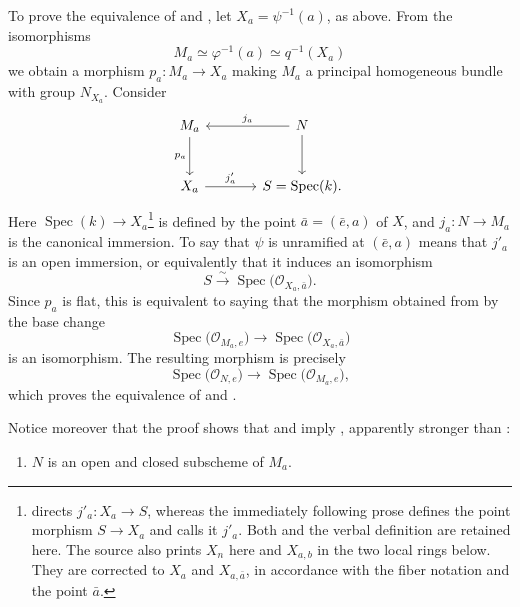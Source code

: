 To prove the equivalence of  and , let
\(X_a=\psi^{-1}(a)\), as above. From the isomorphisms
\[
  M_a\simeq\varphi^{-1}(a)\simeq q^{-1}(X_a)
\]
we obtain a morphism \(p_a:M_a\to X_a\) making \(M_a\) a principal
homogeneous bundle with group \(N_{X_a}\). Consider 
\[
\begin{tikzcd}[column sep=large,row sep=large]
M_a \arrow[d,"p_a"'] &
N \arrow[l,"j_a"'] \arrow[d] \\
X_a \arrow[r,"j'_a"] &
S=\operatorname{Spec}(k).
\end{tikzcd}
\]
Here \(\operatorname{Spec}(k)\to X_a\)\footnote{
directs \(j'_a:X_a\to S\), whereas the immediately following prose
defines the point morphism \(S\to X_a\) and calls it \(j'_a\). Both
 and the verbal definition are retained
here. The source also prints \(X_n\) here and \(X_{a,b}\) in the two
local rings below. They are corrected to \(X_a\) and
\(X_{a,\bar a}\), in accordance with the fiber notation and the point
\(\bar a\).} is defined by the point
\(\bar a=(\bar e,a)\) of \(X\), and \(j_a:N\to M_a\) is the canonical
immersion. To say that \(\psi\) is unramified at \((\bar e,a)\) means
that \(j'_a\) is an open immersion, or equivalently that it induces an
isomorphism
\[
  S\xrightarrow{\sim}\operatorname{Spec}
  \bigl(\mathcal O_{X_a,\bar a}\bigr).
\]
Since \(p_a\) is flat, this is equivalent to saying that the morphism
obtained from  by the base change
\[
  \operatorname{Spec}\bigl(\mathcal O_{M_a,e}\bigr)
  \longrightarrow
  \operatorname{Spec}\bigl(\mathcal O_{X_a,\bar a}\bigr)
\]
is an isomorphism. The resulting morphism is precisely
\[
  \operatorname{Spec}\bigl(\mathcal O_{N,e}\bigr)
  \longrightarrow
  \operatorname{Spec}\bigl(\mathcal O_{M_a,e}\bigr),
\]
which proves the equivalence of  and .

Notice moreover that the proof shows that  and  imply , apparently stronger than :
\begin{enumerate}
\item[(iii bis)] 
  \(N\) is an open and closed subscheme of \(M_a\).
\end{enumerate}

